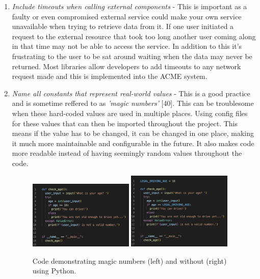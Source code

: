 \begin{enumerate}
    \item \textit{Include timeouts when calling external components} - This is important as a faulty or even compromised external service could make
    your own service unavailable when trying to retrieve data from it. If one user initiated a request to the external resource that took too long 
    another user coming along in that time may not be able to access the service. In addition to this it's frustrating to the user to be sat 
    around waiting when the data may never be returned. Most libraries allow developers to add timeouts to any network request made and this is 
    implemented into the ACME system.

    \item \textit{Name all constants that represent real-world values} - This is a good practice and is sometime reffered to as \textit{'magic numbers'} [40].
    This can be troublesome when these hard-coded values are used in multiple places. Using config files for these values that can then be imported 
    throughout the project. This means if the value has to be changed, it can be changed in one place, making it much more maintainable and configurable
    in the future. It also makes code more readable instead of having seemingly random values throughout the code.

    \begin{figure}[H]
      \centering
      \includegraphics[width=5cm]{assets/magicNumbers.png}
      \includegraphics[width=5cm]{assets/noMagicNumbers.png}
      \caption{Code demonstrating magic numbers (left) and without (right) using Python.}
      \label{fig:magicNumbers}
    \end{figure}

  \end{enumerate}

